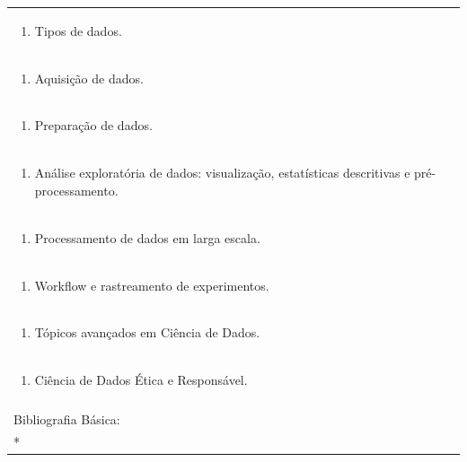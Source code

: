 \documentclass[11pt]{article}
\begin{document}
\begin{center}
\begin{longtable}{|p{4cm}|p{4cm}|p{4cm}|p{4cm}|}
\multicolumn{4}{|p{\dimexpr 16cm + 6\tabcolsep\relax}|}{\begin{enumerate}[start=2]\item Tipos de dados.\end{enumerate}}\\
\multicolumn{4}{|p{\dimexpr 16cm + 6\tabcolsep\relax}|}{\begin{enumerate}[start=3]\item Aquisição de dados.\end{enumerate}}\\
\multicolumn{4}{|p{\dimexpr 16cm + 6\tabcolsep\relax}|}{\begin{enumerate}[start=4]\item Preparação de dados. \end{enumerate}}\\
\multicolumn{4}{|p{\dimexpr 16cm + 6\tabcolsep\relax}|}{\begin{enumerate}[start=5]\item Análise exploratória de dados: visualização, estatísticas descritivas e pré-processamento.\end{enumerate}}\\
\multicolumn{4}{|p{\dimexpr 16cm + 6\tabcolsep\relax}|}{\begin{enumerate}[start=6]\item Processamento de dados em larga escala.\end{enumerate}}\\
\multicolumn{4}{|p{\dimexpr 16cm + 6\tabcolsep\relax}|}{\begin{enumerate}[start=7]\item Workflow e rastreamento de experimentos.\end{enumerate}}\\
\multicolumn{4}{|p{\dimexpr 16cm + 6\tabcolsep\relax}|}{\begin{enumerate}[start=8]\item Tópicos avançados em Ciência de Dados.\end{enumerate}}\\
\multicolumn{4}{|p{\dimexpr 16cm + 6\tabcolsep\relax}|}{\begin{enumerate}[start=9]\item Ciência de Dados Ética e Responsável.\end{enumerate}}\\
\multicolumn{4}{|p{\dimexpr 16cm + 6\tabcolsep\relax}|}{}\\
\hline
\multicolumn{4}{|p{16cm}|}{Bibliografia Básica:}\\*

\end{longtable}
\end{center}
\end{document}
